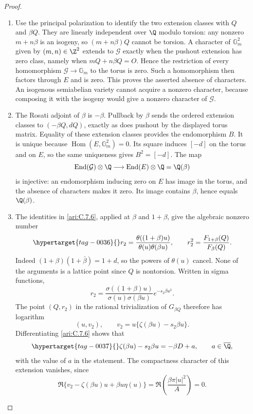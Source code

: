 \begin{proof}
\begin{enumerate}[label=\arabic*.,leftmargin=*]
\item Use the principal polarization to identify the two extension
classes with $Q$ and $\beta Q$. They are linearly independent
over $\Q$ modulo torsion: any nonzero $m+n\beta$ is an
isogeny, so $(m+n\beta)Q$ cannot be torsion. A character
of $\mathbb G_m^2$ given by $(m,n)\in\Z^2$ extends to
$\mathcal G$ exactly when the pushout extension has zero
class, namely when $mQ+n\beta Q=O$. Hence the restriction
of every homomorphism $\mathcal G\to\mathbb G_m$ to
the torus is zero. Such a homomorphism then factors through
$E$ and is zero. This proves the asserted absence of
characters. An isogenous semiabelian variety cannot acquire
a nonzero character, because composing it with the isogeny
would give a nonzero character of $\mathcal G$.

\item The Rosati adjoint of $\beta$ is $-\beta$. Pullback by
$\beta$ sends the ordered extension classes to
$(-\beta Q,dQ)$, exactly as does pushout by the displayed
torus matrix. Equality of these extension classes provides
the endomorphism $B$. It is unique because
$\operatorname{Hom}(E,\mathbb G_m^2)=0$. Its square
induces $[-d]$ on the torus and on $E$, so the same
uniqueness gives $B^2=[-d]$. The map
\[
 \operatorname{End}(\mathcal G)\otimes\Q
     \longrightarrow\operatorname{End}(E)\otimes\Q
          =\Q(\beta)
\]
is injective: an endomorphism inducing zero on $E$ has image
in the torus, and the absence of characters makes it zero.
Its image contains $\beta$, hence equals $\Q(\beta)$.

\item The identities in \ref{ari:C.7.6}, applied at $\beta$
and $1+\beta$, give the algebraic nonzero number
\begin{equation}\hypertarget{tag-0036}{}\label{ari:eq:ce-ribet-r}
 r_2=\frac{\theta((1+\beta)u)}{\theta(u)\theta(\beta u)},
 \qquad r_2^2=\frac{F_{1+\beta}(Q)}{F_\beta(Q)}.
\end{equation}
Indeed $(1+\beta)(1+\bar\beta)=1+d$, so the powers
of $\theta(u)$ cancel. None of the arguments is a lattice
point since $Q$ is nontorsion. Written in sigma functions,
\[
 r_2=\frac{\sigma((1+\beta)u)}{\sigma(u)\sigma(\beta u)}
                         e^{-s_2\beta u^2}.
\]
The point $(Q,r_2)$ in the rational trivialization of
$G_{\beta Q}$ therefore has logarithm
\[
 (u,v_2),\qquad
 v_2=u\{\zeta(\beta u)-s_2\beta u\}.
\]
Differentiating \ref{ari:C.7.6} shows that
\begin{equation}\hypertarget{tag-0037}{}\label{ari:eq:ce-zeta}
 \zeta(\beta u)-s_2\beta u=-\beta D+a,
 \qquad a\in\overline\Q,
\end{equation}
with the value of $a$ in the statement. The compactness
character of this extension vanishes, since
\[
 \Re\{v_2-\zeta(\beta u)u+\beta u\eta(u)\}
    =\Re\left(\frac{\beta\pi|u|^2}{A}\right)=0.
\]


\end{enumerate}
\end{proof}
